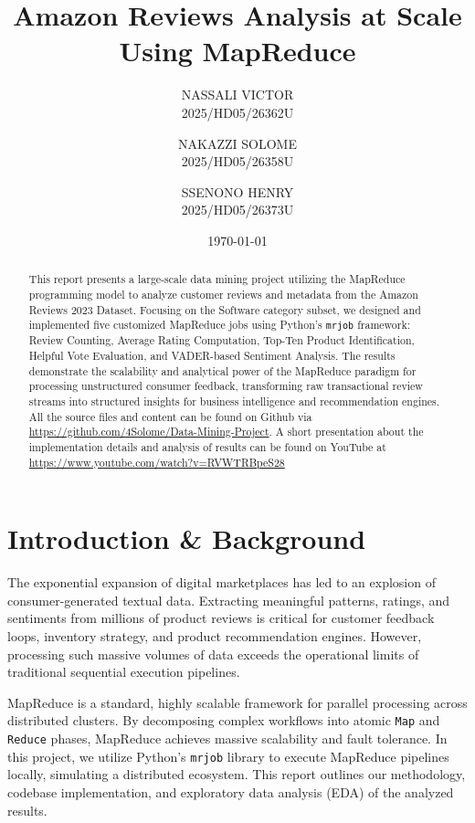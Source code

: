 \documentclass[12pt, a4paper]{article}
\title{\textbf{Amazon Reviews Analysis at Scale Using MapReduce}}
\author{NASSALI VICTOR \\ 2025/HD05/26362U \and
NAKAZZI SOLOME \\ 2025/HD05/26358U \and
SSENONO HENRY \\ 2025/HD05/26373U \\
}
\date{\today}
\begin{document}
	
	\maketitle
	
	\begin{abstract}
		This report presents a large-scale data mining project utilizing the MapReduce programming model to analyze customer reviews and metadata from the Amazon Reviews 2023 Dataset. Focusing on the Software category subset, we designed and implemented five customized MapReduce jobs using Python's \texttt{mrjob} framework: Review Counting, Average Rating Computation, Top-Ten Product Identification, Helpful Vote Evaluation, and VADER-based Sentiment Analysis. The results demonstrate the scalability and analytical power of the MapReduce paradigm for processing unstructured consumer feedback, transforming raw transactional review streams into structured insights for business intelligence and recommendation engines. All the source files and content can be found on Github via \href{https://github.com/4Solome/Data-Mining-Project}{https://github.com/4Solome/Data-Mining-Project}. A short presentation about the implementation details and analysis of results can be found on YouTube at \href{https://www.youtube.com/watch?v=RVWTRBpeS28}{https://www.youtube.com/watch?v=RVWTRBpeS28}
	\end{abstract}
	
	\newpage
	
	\tableofcontents
	\newpage
	
	\section{Introduction \& Background}
	The exponential expansion of digital marketplaces has led to an explosion of consumer-generated textual data. Extracting meaningful patterns, ratings, and sentiments from millions of product reviews is critical for customer feedback loops, inventory strategy, and product recommendation engines. However, processing such massive volumes of data exceeds the operational limits of traditional sequential execution pipelines.
	
	MapReduce is a standard, highly scalable framework for parallel processing across distributed clusters. By decomposing complex workflows into atomic \texttt{Map} and \texttt{Reduce} phases, MapReduce achieves massive scalability and fault tolerance. In this project, we utilize Python's \texttt{mrjob} library to execute MapReduce pipelines locally, simulating a distributed ecosystem. This report outlines our methodology, codebase implementation, and exploratory data analysis (EDA) of the analyzed results.
	
\end{document}
